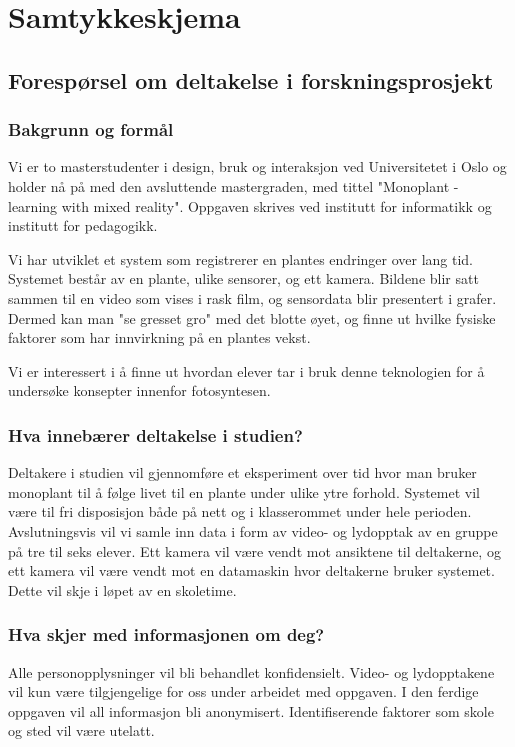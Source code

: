 \chapter{Samtykkeskjema}
\label{samtykkeskjema}
\section*{Forespørsel om deltakelse i forskningsprosjekt}


\subsection*{Bakgrunn og formål}
Vi er to masterstudenter i design, bruk og interaksjon ved Universitetet i Oslo og holder nå på med den avsluttende mastergraden, med tittel "Monoplant - learning with mixed reality". Oppgaven skrives ved institutt for informatikk og institutt for pedagogikk. 

Vi har utviklet et system som registrerer en plantes endringer over lang tid. Systemet består av en plante, ulike sensorer, og ett kamera. Bildene blir satt sammen til en video som vises i rask film, og sensordata blir presentert i grafer. Dermed kan man "se gresset gro" med det blotte øyet, og finne ut hvilke fysiske faktorer som har innvirkning på en plantes vekst. 

Vi er interessert i å finne ut hvordan elever tar i bruk denne teknologien for å undersøke konsepter innenfor fotosyntesen. 

\subsection*{Hva innebærer deltakelse i studien?}
Deltakere i studien vil gjennomføre et eksperiment over tid hvor man bruker monoplant til å følge livet til en plante under ulike ytre forhold. Systemet vil være til fri disposisjon både på nett og i klasserommet under hele perioden. Avslutningsvis vil vi samle inn data i form av video- og lydopptak av en gruppe på tre til seks elever. Ett kamera vil være vendt mot ansiktene til deltakerne, og ett kamera vil være vendt mot en datamaskin hvor deltakerne bruker systemet. Dette vil skje i løpet av en skoletime. 

\subsection*{Hva skjer med informasjonen om deg?}
Alle personopplysninger vil bli behandlet konfidensielt. Video- og lydopptakene vil kun være tilgjengelige for oss under arbeidet med oppgaven. I den ferdige oppgaven vil all informasjon bli anonymisert. Identifiserende faktorer som skole og sted vil være utelatt. 

